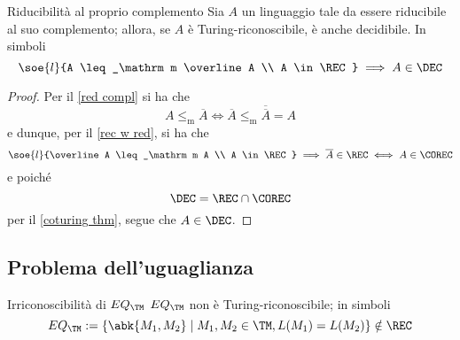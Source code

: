 \documentclass[a4paper, 12pt]{report}
\begin{document}
    \begin{framedcor}{Riducibilità al proprio complemento}
        Sia $A$ un linguaggio tale da essere riducibile al suo complemento; allora, se $A$ è Turing-riconoscibile, è anche decidibile. In simboli $$\soe{l}{A \leq_\mathrm m \overline A \\ A \in \REC} \implies A \in \DEC$$
    \end{framedcor}

    \begin{proof}
        Per il \cref{red compl} si ha che $$A \leq_\mathrm m \overline A \iff \overline A \leq_\mathrm m \overline {\overline A} = A$$ e dunque, per il \cref{rec w red}, si ha che $$\soe{l}{\overline A \leq_\mathrm m A \\ A \in \REC} \implies \overline A \in \REC \iff A \in \COREC$$ e poiché $$\DEC = \REC \cap \COREC$$ per il \cref{coturing thm}, segue che $A \in \DEC$.
    \end{proof}

    \subsection{Problema dell'uguaglianza}

    \begin{framedthm}[label={eq_tm not in rec}]{Irriconoscibilità di $EQ_\TM$}
        $EQ_\TM$ non è Turing-riconoscibile; in simboli $$EQ_\TM := \{\abk{M_1, M_2} \mid M_1, M_2 \in \TM, L(M_1) = L(M_2)\} \notin \REC$$
    \end{framedthm}
\end{document}
